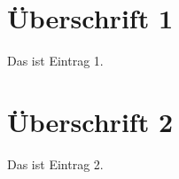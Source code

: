 \documentclass{scrreprt}
\begin{document}
\tableofcontents

\chapter{Überschrift 1}
Das ist Eintrag 1.

\chapter{Überschrift 2}
Das ist Eintrag 2.

\clearpage

\printindex
\end{document}
